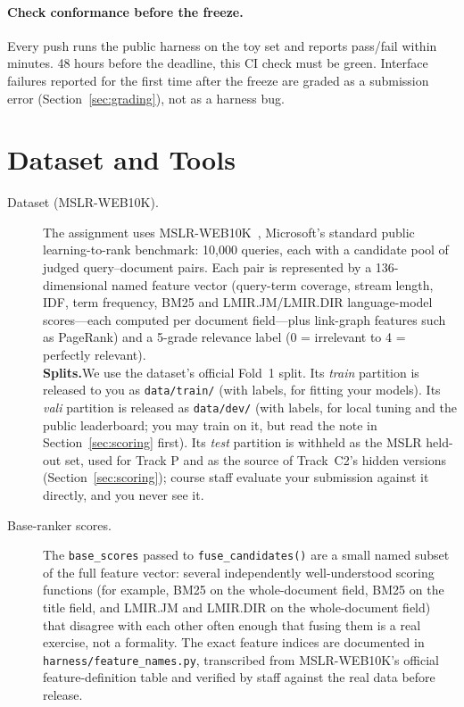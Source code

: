 \documentclass[10pt]{article}
\begin{document}
\paragraph{Check conformance before the freeze.}
Every push runs the public harness on the toy set and reports pass/fail within minutes. 48 hours before the deadline, this CI check must be green. Interface failures reported for the first time after the freeze are graded as a submission error (Section~\ref{sec:grading}), not as a harness bug.

\section{Dataset and Tools}
\label{sec:data}

\begin{description}
  \item[Dataset (MSLR-WEB10K).]
  The assignment uses MSLR-WEB10K~\cite{qinliu2013}, Microsoft's standard public learning-to-rank benchmark: 10{,}000 queries, each with a candidate pool of judged query--document pairs. Each pair is represented by a 136-dimensional named feature vector (query-term coverage, stream length, IDF, term frequency, BM25 and LMIR.JM/LMIR.DIR language-model scores---each computed per document field---plus link-graph features such as PageRank) and a 5-grade relevance label (0 = irrelevant to 4 = perfectly relevant).\\
  \textbf{Splits.}We use the dataset's official Fold~1 split. Its \emph{train} partition is released to you as \texttt{data/train/} (with labels, for fitting your models). Its \emph{vali} partition is released as \texttt{data/dev/} (with labels, for local tuning and the public leaderboard; you may train on it, but read the note in Section~\ref{sec:scoring} first). Its \emph{test} partition is withheld as the MSLR held-out set, used for Track P and as the source of Track~C2’s hidden versions (Section~\ref{sec:scoring}); course staff evaluate your submission against it directly, and you never see it.

  \item[Base-ranker scores.]
  The \texttt{base\_scores} passed to \texttt{fuse\_candidates()} are a small named subset of the full feature vector: several independently well-understood scoring functions (for example, BM25 on the whole-document field, BM25 on the title field, and LMIR.JM and LMIR.DIR on the whole-document field) that disagree with each other often enough that fusing them is a real exercise, not a formality. The exact feature indices are documented in \texttt{harness/feature\_names.py}, transcribed from MSLR-WEB10K's official feature-definition table and verified by staff against the real data before release.


\end{description}
\end{document}
